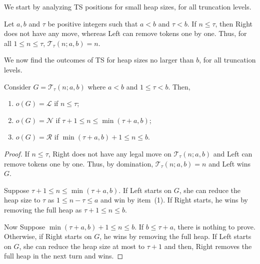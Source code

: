 \documentclass[oneside,reqno]{amsart}
\newcommand{\ts}{\mathcal{T}}
\newcommand{\lp}{\mathscr{L}}
\newcommand{\rp}{\mathscr{R}}
\newcommand{\np}{\mathscr{N}}
\newcommand{\pp}{\mathscr{P}}
\begin{document}
 
We start by analyzing {\sc TS} positions for small heap sizes, for all truncation levels.
\begin{observation}\label{obs: TS=n if n<=tau}
    Let $a,b$ and $\tau$ be positive integers such that $a<b$ and $\tau<b$. 
If $n\le \tau$, then Right does not have any move, whereas Left can remove tokens one by one. Thus, for all $1\le n\le\tau$,  $\ts_\tau(n;a,b)=n$. 
\end{observation}

We now find the outcomes of {\sc TS} for heap sizes no larger than $b$, for all truncation levels.
\begin{lemma}\label{lem: outcome TS heap<=b}
    Consider $G=\ts_\tau(n;a,b)$ where $a<b$ and $1\le \tau<b$. Then, 
    \begin{enumerate}
        \item\label{item:lem: outcome TS heap<=b:1} $o(G)=\lp$ if $n\le \tau$;
        \item\label{item:lem: outcome TS heap<=b:2} $o(G)=\np$ if $\tau+1\le n\le \min(\tau+a,b)$;
        \item\label{item:lem: outcome TS heap<=b:3} $o(G)=\rp$ if $\min(\tau+a,b)+1\le n\le b$.
    \end{enumerate}
\end{lemma}
\begin{proof}
    If $n\le \tau$, Right does not have any legal move on $\ts_\tau(n;a,b)$ and Left can remove tokens one by one. Thus, by domination, $\ts_\tau(n;a,b)=n$ and Left wins $G$. 
    
    Suppose $\tau+1\le n\le \min(\tau+a,b)$. If Left starts on $G$, she can reduce the heap size to $\tau$ as $1\le n-\tau\le a$ and win by item~(1). If Right starts, he wins by removing the full heap as $\tau+1\le n\le b$.

    Now Suppose $\min(\tau+a,b)+1\le n\le b$. If $b\le \tau+a$, there is nothing to prove. Otherwise, if Right starts on $G$, he wins by removing the full heap. If Left starts on $G$, she can reduce the heap size at most to $\tau+1$ and then, Right removes the full heap in the next turn and wins.
\end{proof}
\end{document}
